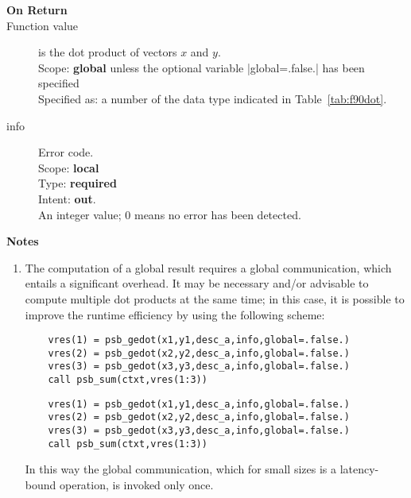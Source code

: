 \begin{description}
\item[\bf On Return]
\item[Function value] is the dot product of vectors $x$ and $y$.\\
Scope: {\bf global}  unless the optional variable
\fortinline|global=.false.| has been specified\\
Specified as: a number of the data type indicated in Table~\ref{tab:f90dot}.
\item[info] Error code.\\
Scope: {\bf local} \\
Type: {\bf required} \\
Intent: {\bf out}.\\
An integer value; 0 means no error has been detected.
\end{description}

{\par\noindent\large\bfseries Notes}
\begin{enumerate}
\item The computation of a global result requires a global
  communication, which entails a significant overhead. It may be
  necessary and/or advisable to compute multiple dot products at the same
  time; in this case, it is possible to improve the runtime efficiency
  by using the following scheme:
  \ifpdf
  \begin{verbatim}
  	vres(1) = psb_gedot(x1,y1,desc_a,info,global=.false.)
  	vres(2) = psb_gedot(x2,y2,desc_a,info,global=.false.)
  	vres(3) = psb_gedot(x3,y3,desc_a,info,global=.false.)
  	call psb_sum(ctxt,vres(1:3))
  \end{verbatim}
  \else
  \begin{lstlisting}
    vres(1) = psb_gedot(x1,y1,desc_a,info,global=.false.)
    vres(2) = psb_gedot(x2,y2,desc_a,info,global=.false.)
    vres(3) = psb_gedot(x3,y3,desc_a,info,global=.false.)
    call psb_sum(ctxt,vres(1:3))
  \end{lstlisting}
  \fi
  In this way the global communication, which for small sizes is a
  latency-bound operation, is invoked only once.
\end{enumerate}

